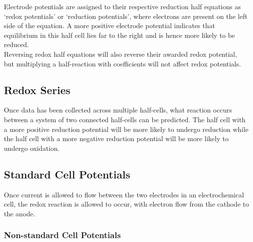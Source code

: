 \documentclass[../main]{subfiles}
\begin{document}
	Electrode potentials are assigned to their respective reduction half equations as `redox potentials' or `reduction potentials', where electrons are present on the left side of the equation. A more positive electrode potential indicates that equilibrium in this half cell lies far to the right and is hence more likely to be reduced. \\

	Reversing redox half equations will also reverse their awarded redox potential, but multiplying a half-reaction with coefficients will not affect redox potentials.

	\subsection{Redox Series}

	Once data has been collected across multiple half-cells, what reaction occurs between a system of two connected half-cells can be predicted. The half cell with a more positive reduction potential will be more likely to undergo reduction while the half cell with a more negative reduction potential will be more likely to undergo oxidation. \\

	\subsection{Standard Cell Potentials}




	Once current is allowed to flow between the two electrodes in an electrochemical cell, the redox reaction is allowed to occur, with electron flow from the cathode to the anode.


	\subsubsection{Non-standard Cell Potentials}
\end{document}
